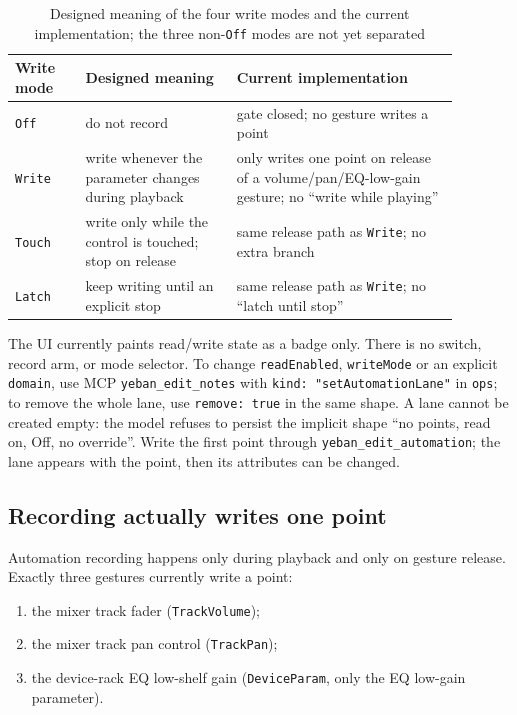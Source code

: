 \begin{table}[htbp]
\centering
\small
\begin{tabular}{@{}p{0.14\linewidth}p{0.30\linewidth}p{0.44\linewidth}@{}}
\hline
Write mode & Designed meaning & Current implementation \\
\hline
\texttt{Off} & do not record & gate closed; no gesture writes a point \\
\texttt{Write} & write whenever the parameter changes during playback & only writes one point on release of a volume/pan/EQ-low-gain gesture; no ``write while playing'' \\
\texttt{Touch} & write only while the control is touched; stop on release & same release path as \texttt{Write}; no extra branch \\
\texttt{Latch} & keep writing until an explicit stop & same release path as \texttt{Write}; no ``latch until stop'' \\
\hline
\end{tabular}
\caption{Designed meaning of the four write modes and the current implementation; the three non-\texttt{Off} modes are not yet separated}
\label{tab:automation-write-modes}
\end{table}

The UI currently paints read/write state as a badge only. There is no switch, record arm, or mode selector. To change \texttt{readEnabled}, \texttt{writeMode} or an explicit \texttt{domain}, use MCP \texttt{yeban\_edit\_notes} with \texttt{kind: "set\allowbreak Automation\allowbreak Lane"} in \texttt{ops}; to remove the whole lane, use \texttt{remove: true} in the same shape. A lane cannot be created empty: the model refuses to persist the implicit shape ``no points, read on, Off, no override''. Write the first point through \texttt{yeban\_edit\_automation}; the lane appears with the point, then its attributes can be changed.

\subsection{Recording actually writes one point}

Automation recording happens only during playback and only on gesture release. Exactly three gestures currently write a point:

\begin{enumerate}
  \item the mixer track fader (\texttt{TrackVolume});
  \item the mixer track pan control (\texttt{TrackPan});
  \item the device-rack EQ low-shelf gain (\texttt{DeviceParam}, only the EQ low-gain parameter).
\end{enumerate}

